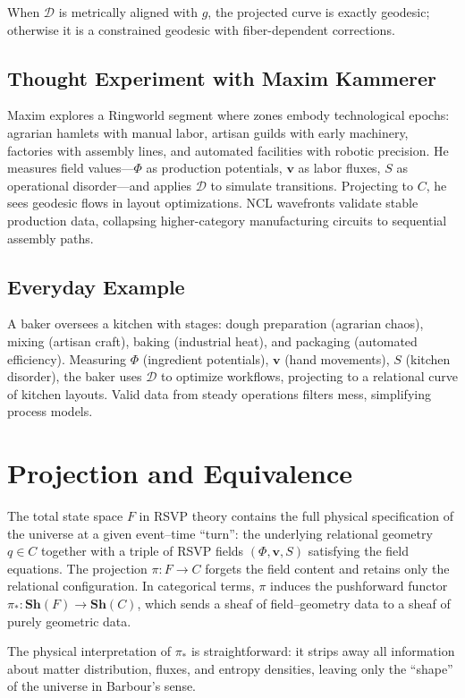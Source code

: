 \documentclass[11pt]{article}
\theoremstyle{plain}
\theoremstyle{definition}
\begin{document}
When $\mathcal{D}$ is metrically aligned with $g$, the projected curve is exactly geodesic; otherwise it is a constrained geodesic with fiber-dependent corrections.

\subsection{Thought Experiment with Maxim Kammerer}
Maxim explores a Ringworld segment where zones embody technological epochs: agrarian hamlets with manual labor, artisan guilds with early machinery, factories with assembly lines, and automated facilities with robotic precision. He measures field values—$\Phi$ as production potentials, $\mathbf{v}$ as labor fluxes, $S$ as operational disorder—and applies $\mathcal{D}$ to simulate transitions. Projecting to $C$, he sees geodesic flows in layout optimizations. NCL wavefronts validate stable production data, collapsing higher-category manufacturing circuits to sequential assembly paths.

\subsection{Everyday Example}
A baker oversees a kitchen with stages: dough preparation (agrarian chaos), mixing (artisan craft), baking (industrial heat), and packaging (automated efficiency). Measuring $\Phi$ (ingredient potentials), $\mathbf{v}$ (hand movements), $S$ (kitchen disorder), the baker uses $\mathcal{D}$ to optimize workflows, projecting to a relational curve of kitchen layouts. Valid data from steady operations filters mess, simplifying process models.

\section{Projection and Equivalence}

The total state space $F$ in RSVP theory contains the full physical specification of the universe at a given event–time “turn”: the underlying relational geometry $q \in C$ together with a triple of RSVP fields $(\Phi, \mathbf{v}, S)$ satisfying the field equations. The projection
$\pi: F \to C$
forgets the field content and retains only the relational configuration. In categorical terms, $\pi$ induces the pushforward functor
$\pi_* : \mathbf{Sh}(F) \to \mathbf{Sh}(C)$,
which sends a sheaf of field–geometry data to a sheaf of purely geometric data.

The physical interpretation of $\pi_*$ is straightforward: it strips away all information about matter distribution, fluxes, and entropy densities, leaving only the “shape” of the universe in Barbour’s sense.
\end{document}
